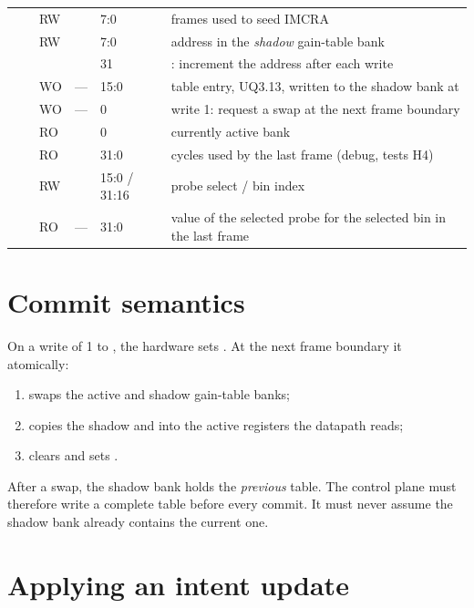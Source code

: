 \begin{table}[htbp]
\begin{tabularx}{\textwidth}{@{}lllllL@{}}
 &  & RW &  & 7:0 & frames used to seed IMCRA \\
 &  & RW &  & 7:0 & address in the \emph{shadow} gain-table bank \\
 & & & & 31 & : increment the address after each  write \\
 &  & WO & --- & 15:0 & table entry, UQ3.13, written to the shadow bank at  \\
 &  & WO & --- & 0 & write 1: request a swap at the next frame boundary \\
 &  & RO &  & 0 & currently active bank \\
 &  & RO &  & 31:0 & cycles used by the last frame (debug, tests H4) \\
 &  & RW &  & 15:0 / 31:16 & probe select / bin index \\
 &  & RO & --- & 31:0 & value of the selected probe for the selected bin in the last frame \\
\bottomrule
\end{tabularx}
\end{table}

\section*{Commit semantics}

On a write of 1 to , the hardware sets
. At the next frame boundary it atomically:
\begin{enumerate}
  \item swaps the active and shadow gain-table banks;
  \item copies the shadow  and  into the
        active registers the datapath reads;
  \item clears  and sets .
\end{enumerate}
After a swap, the shadow bank holds the \emph{previous} table. The control plane
must therefore write a complete table before every commit. It must never assume
the shadow bank already contains the current one.

\section*{Applying an intent update}

